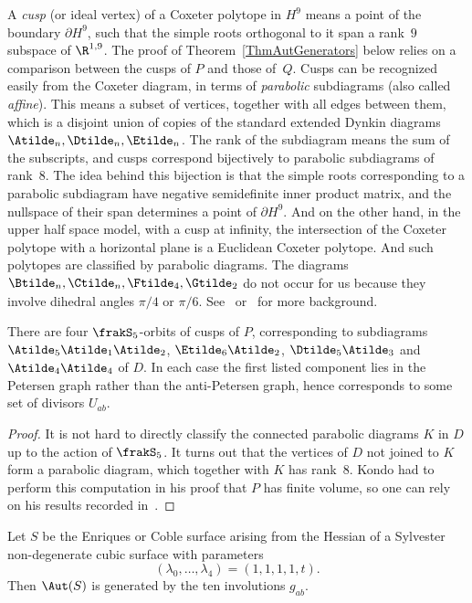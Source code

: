 A \emph{cusp} (or ideal vertex) of a Coxeter polytope in $H^9$ means a point of the boundary $\partial H^9$, such that the simple roots orthogonal to it span a rank~$9$ subspace of $\R^{1,9}$. The proof of Theorem~\ref{ThmAutGenerators} below relies on a comparison between the cusps of $P$ and those of~$Q$. Cusps can be recognized easily from the Coxeter diagram, in terms of \emph{parabolic} subdiagrams (also called \emph{affine}). This means a subset of vertices, together with all edges between them, which is a disjoint union of copies of the standard extended Dynkin diagrams $\Atilde_n,\Dtilde_n,\Etilde_n$. The rank of the subdiagram means the sum of the subscripts, and cusps correspond bijectively to parabolic subdiagrams of rank~$8$. The idea behind this bijection is that the simple roots corresponding to a parabolic subdiagram have negative semidefinite inner product matrix, and the nullspace of their span determines a point of $\partial H^9$. And on the other hand, in the upper half space model, with a cusp at infinity, the intersection of the Coxeter polytope with a horizontal plane is a Euclidean Coxeter polytope. And such polytopes are classified by parabolic diagrams. The diagrams $\Btilde_n,\Ctilde_n,\Ftilde_4,\Gtilde_2$ do not occur for us because they involve dihedral angles $\pi/4$ or $\pi/6$. See~\cite[Sections~2--3]{Vinberg} or~\cite{DolgachevBulletin} for more background.

\begin{lemm}\label{LemCusps}
There are four $\frakS_5$-orbits of cusps of $P$, corresponding to subdiagrams $\Atilde_5\Atilde_1\Atilde_2$, $\Etilde_6\Atilde_2$, $\Dtilde_5\Atilde_3$ and $\Atilde_4\Atilde_4$ of $D$. In each case the first listed component lies in the Petersen graph rather than the anti-Petersen graph, hence corresponds to some set of divisors $U_{ab}$.
\end{lemm}

\begin{proof}
It is not hard to directly classify the connected parabolic diagrams $K$ in $D$ up to the action of $\frakS_5$. It turns out that the vertices of $D$ not joined to $K$ form a parabolic diagram, which together with $K$ has rank~$8$. Kondo had to perform this computation in his proof that $P$ has finite volume, so one can rely on his results recorded in~\cite[p.~226]{Kondo}.
\end{proof}

\begin{theo}\label{ThmAutGenerators}
Let $S$ be the Enriques or Coble surface arising from the Hessian of a Sylvester non-degenerate cubic surface with parameters
\begin{equation*}
(\lambda_0,\dots,\lambda_4)=(1,1,1,1,t).
\end{equation*}
Then $\Aut(S)$ is generated by the ten involutions $g_{ab}$.
\end{theo}

